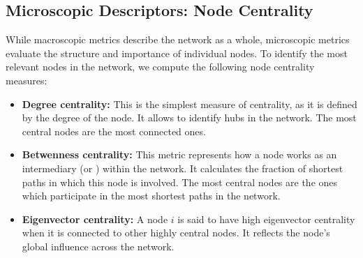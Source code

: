 \documentclass{article}
\begin{document}
\subsection{Microscopic Descriptors: Node Centrality}

While macroscopic metrics describe the network as a whole, microscopic metrics evaluate the structure and importance of individual nodes. To identify the most relevant nodes in the network, we compute the following node centrality measures:

\begin{itemize}
    \item \textbf{Degree centrality:} This is the simplest measure of centrality, as it is defined by the degree of the node. It allows to identify hubs in the network. The most central nodes are the most connected ones.
    
    \item \textbf{Betwenness centrality:} This metric represents how a node works as an intermediary (or ) within the network. It calculates the fraction of shortest paths in which this node is involved. The most central nodes are the ones which participate in the most shortest paths in the network.
    
    \item \textbf{Eigenvector centrality:} A node $i$ is said to have high eigenvector centrality when it is connected to other highly central nodes. It reflects the node's global influence across the network.
\end{itemize}
\end{document}
